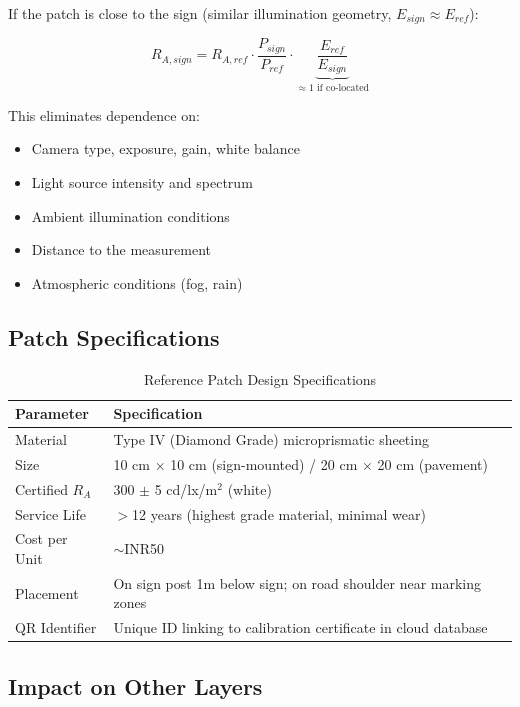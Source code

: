 \documentclass[11pt,a4paper]{article}
\newcommand{\rupmark}{\textrm{INR}}
\begin{document}
If the patch is close to the sign (similar illumination geometry, $E_{sign} \approx E_{ref}$):

\begin{equation}
R_{A,sign} = R_{A,ref} \cdot \frac{P_{sign}}{P_{ref}} \cdot \underbrace{\frac{E_{ref}}{E_{sign}}}_{\approx 1 \text{ if co-located}}
\label{eq:patch_measurement}
\end{equation}

This eliminates dependence on:
\begin{itemize}[noitemsep]
    \item Camera type, exposure, gain, white balance
    \item Light source intensity and spectrum
    \item Ambient illumination conditions
    \item Distance to the measurement
    \item Atmospheric conditions (fog, rain)
\end{itemize}

\subsection{Patch Specifications}

\begin{table}[H]
\centering
\caption{Reference Patch Design Specifications}
\label{tab:patch_specs}
\begin{tabular}{@{}ll@{}}
\toprule
\textbf{Parameter} & \textbf{Specification} \\
\midrule
Material & Type IV (Diamond Grade) microprismatic sheeting \\
Size & 10 cm $\times$ 10 cm (sign-mounted) / 20 cm $\times$ 20 cm (pavement) \\
Certified $R_A$ & 300 $\pm$ 5 cd/lx/m$^2$ (white) \\
Service Life & $>$12 years (highest grade material, minimal wear) \\
Cost per Unit & $\sim$\rupmark50 \\
Placement & On sign post 1m below sign; on road shoulder near marking zones \\
QR Identifier & Unique ID linking to calibration certificate in cloud database \\
\bottomrule
\end{tabular}
\end{table}

\subsection{Impact on Other Layers}
\end{document}
